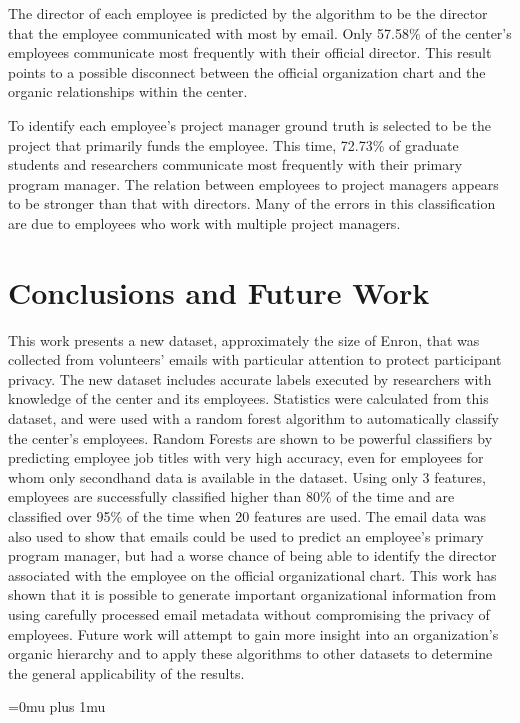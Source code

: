 \documentclass[10pt,twocolumn,conference]{IEEEtran}
\begin{document}
The director of each employee is predicted by the algorithm to be the director that the employee communicated with most by email.  Only 57.58\% of the center's employees communicate most frequently with their official director.   This result points to a possible disconnect between the official organization chart and the organic relationships within the center.

To identify each employee's project manager ground truth is selected to be the project that primarily funds the employee.  This time, 72.73\% of graduate students and researchers communicate most frequently with their primary program manager.  The relation between employees to project managers appears to be stronger than that with directors.  Many of the errors in this classification are due to employees who work with multiple project managers.  

\section{Conclusions and Future Work} \label{Conclusions}
This work presents a new dataset, approximately the size of Enron, that was collected from volunteers' emails with particular attention to protect participant privacy.  The new dataset includes accurate labels executed by researchers with knowledge of the center and its employees.  Statistics were calculated from this dataset, and were used with a random forest algorithm to automatically classify the center's employees.  Random Forests are shown to be powerful classifiers by predicting employee job titles with very high accuracy, even for employees for whom only secondhand data is available in the dataset.  Using only 3 features, employees are successfully classified higher than 80\% of the time and are classified over 95\% of the time when 20 features are used.  The email data was also used to show that emails could be used to predict an employee's primary program manager, but had a worse chance of being able to identify the director associated with the employee on the official organizational chart.  This work has shown that it is possible to generate important organizational information from using carefully processed email metadata without compromising the privacy of employees.  Future work will attempt to gain more insight into an organization's organic hierarchy and to apply these algorithms to other datasets to determine the general applicability of the results.

\clearpage
\Urlmuskip=0mu plus 1mu\relax


\end{document}
